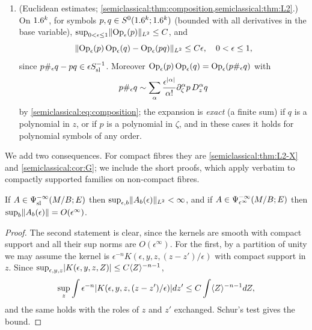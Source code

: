 \begin{enumerate}[label=(S\arabic*),leftmargin=*]
  $\tilde\sigma_0(A)=[a]$ independent of $\epsilon$ (the quantization map $q_\epsilon$
  of \cref{semiclassical:thm:manifold-calculus}(d) applied to $a$, regarded as
  constant in $\epsilon$).
\item\label{scindex:S-euclid} (Euclidean estimates;
  \cref{semiclassical:thm:composition,semiclassical:thm:L2}.) On $1.6^k$, for
  symbols $p,q\in S^{0}(1.6^k;1.6^k)$ (bounded with all derivatives in the base
  variable), $\sup_{0<\epsilon\le1}\lVert \operatorname{Op}_\epsilon(p)\rVert_{L^2}\le C$, and
  \begin{equation*}
    \lVert \operatorname{Op}_\epsilon(p)\operatorname{Op}_\epsilon(q)-\operatorname{Op}_\epsilon(pq)\rVert_{L^2}\le C\epsilon,\quad 0<\epsilon\le1,
  \end{equation*}
  since $p\#_\epsilon q-pq\in\epsilon S^{-1}_{\mathrm{sl}}$. Moreover
  $\operatorname{Op}_\epsilon(p)\operatorname{Op}_\epsilon(q)=\operatorname{Op}_\epsilon(p\#_\epsilon q)$ with
  \begin{equation*}
    p\#_\epsilon q\sim\sum_\alpha\frac{\epsilon^{\lvert \alpha\rvert}}{\alpha!}
    \partial_\zeta^\alpha p\,D_z^\alpha q
  \end{equation*}
  by \eqref{semiclassical:eq:composition}; the expansion is \emph{exact} (a finite
  sum) if $q$ is a polynomial in $z$, or if $p$ is a polynomial in $\zeta$, and in
  these cases it holds for polynomial symbols of any order.
\end{enumerate}

We add two consequences. For compact fibres they are
\cref{semiclassical:thm:L2-X} and \cref{semiclassical:cor:G}; we include the short
proofs, which apply verbatim to compactly supported families on non-compact fibres.

\begin{lemma}\label{scindex:lem:uniform}
  If $A\in\Psi^{-\infty}_{\mathrm{sl}}(M/B;E)$ then $\sup_{\epsilon,b}\lVert A_b(\epsilon)\rVert
  _{L^2}<\infty$, and if $A\in\Psi^{-\infty}_{\epsilon^\infty}(M/B;E)$ then $\sup_b\lVert A_b(\epsilon)\rVert
  =O(\epsilon^\infty)$.
\end{lemma}
\begin{proof}
  The second statement is clear, since the kernels are smooth with compact
  support and all their sup norms are $O(\epsilon^\infty)$. For the first,
  by a partition of unity we may assume the kernel is
  $\epsilon^{-n}K(\epsilon,y,z,(z-z')/\epsilon)$ with compact support in $z$.
  Since $\sup_{\epsilon,y,z}\lvert K(\epsilon,y,z,Z)\rvert\le C\langle Z\rangle^{-n-1}$,
  \begin{equation*}
    \sup_z\int\epsilon^{-n}\lvert K(\epsilon,y,z,(z-z')/\epsilon)\rvert dz'
    \le C\int\langle Z\rangle^{-n-1}dZ,
  \end{equation*}
  and the same holds with the roles of $z$ and $z'$ exchanged. Schur's test
  gives the bound.
\end{proof}

